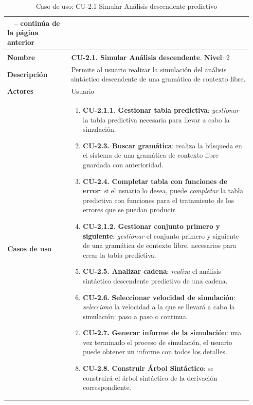  \begin{longtable}[H]{|>{\columncolor[rgb]{0.63,0.79,0.95}}m{6cm} | m{8.5cm} |}
 \caption{Caso de uso: CU-2.1 Simular Análisis descendente predictivo} \\
 \endfirsthead
 \multicolumn{2}{c}
 {{ \tablename\ \thetable{} -- continúa de la página anterior}} \\
 \endhead
 \hline \multicolumn{2}{|r|}{{Continúa en la página siguiente}} \\ \hline
 \endfoot
 \hline
 \endlastfoot
  \hline
  \textbf{Nombre} & \textbf{CU-2.1. Simular Análisis descendente}. \newline \textbf{Nivel}: 2  \\ \hline
  \textbf{Descripción} & Permite al usuario realizar la simulación del análisis sintáctico descendente de una gramática de contexto libre.\\ \hline                 
  \textbf{Actores} & Usuario \\ \hline
  \textbf{Casos de uso} & 
     \begin{enumerate}
     \item \textbf{CU-2.1.1. Gestionar tabla predictiva}: \textit{gestionar} la tabla predictiva  necesaria para llevar a cabo la simulación.
     \item \textbf{CU-2.3. Buscar gramática}: realiza la búsqueda en el sistema de una gramática de contexto libre guardada con anterioridad.
     \item \textbf{CU-2.4. Completar tabla con funciones de error}: si el usuario lo desea, puede \textit{completar} la tabla predictiva con funciones para el tratamiento de los errores  que se 	puedan producir.
     \item \textbf{CU-2.1.2. Gestionar conjunto primero y siguiente}: \textit{gestionar} el  conjunto primero y siguiente de una gramática de contexto libre, necesarios para crear la tabla predictiva.			  
     \item \textbf{CU-2.5. Analizar cadena}: \textit{realiza} el análisis sintáctico descendente predictivo de una cadena.
     \item \textbf{CU-2.6. Seleccionar velocidad de simulación}: \textit{selecciona} la velocidad a la que se llevará a cabo la simulación: paso a paso o continua.
     \item \textbf{CU-2.7. Generar informe de la simulación}: una vez terminado el proceso de simulación, el usuario puede obtener un informe con todos los detalles.
     \item \textbf{CU-2.8. Construir Árbol Sintáctico}: se construirá el árbol sintáctico de la derivación correspondiente.
     \end{enumerate} \\ \hline
                                 

\end{longtable}
